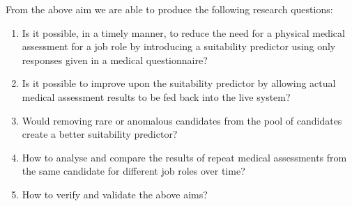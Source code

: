 
\noindent
From the above aim we are able to produce the following research questions:

\begin{enumerate}[label=Question \arabic*:, leftmargin=*]
    \item Is it possible, in a timely manner, to reduce the need for a physical medical assessment for a job role by introducing a suitability predictor using only responses given in a medical questionnaire?

    \item Is it possible to improve upon the suitability predictor by allowing actual medical assessment results to be fed back into the live system? 
    
    \item Would removing rare or anomalous candidates from the pool of candidates create a better suitability predictor?
    
    \item How to analyse and compare the results of repeat medical assessments from the same candidate for different job roles over time? 
    
    \item How to verify and validate the above aims?
\end{enumerate}




